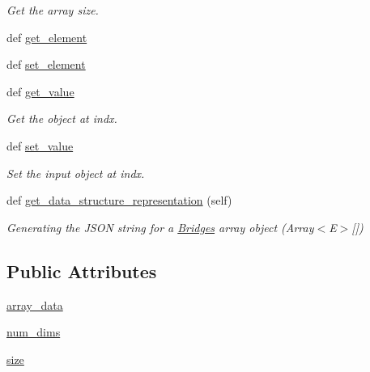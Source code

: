\begin{DoxyCompactItemize}
\begin{DoxyCompactList}\small\item\em Get the array size. \end{DoxyCompactList}\item 
def \hyperlink{class_array_1_1_array_af6c128376f7da8e5c9d5cff376e91d27}{get\+\_\+element}
\item 
def \hyperlink{class_array_1_1_array_ae0ef8d2502f319fe5dd57b965b36bfe9}{set\+\_\+element}
\item 
def \hyperlink{class_array_1_1_array_a5185dc5446c5a4462ebb50ce92ffb755}{get\+\_\+value}
\begin{DoxyCompactList}\small\item\em Get the object at \textquotesingle{}indx\textquotesingle{}. \end{DoxyCompactList}\item 
def \hyperlink{class_array_1_1_array_a682f36ee39851758da013ae3d2e6708a}{set\+\_\+value}
\begin{DoxyCompactList}\small\item\em Set the input object at \textquotesingle{}indx\textquotesingle{}. \end{DoxyCompactList}\item 
def \hyperlink{class_array_1_1_array_aaceb6a3c839b2345d966f3815a3bd1cb}{get\+\_\+data\+\_\+structure\+\_\+representation} (self)
\begin{DoxyCompactList}\small\item\em Generating the J\+S\+O\+N string for a \hyperlink{namespace_bridges}{Bridges} array object (Array$<$\+E$>$\mbox{[}\mbox{]}) \end{DoxyCompactList}\end{DoxyCompactItemize}
\subsection*{Public Attributes}
\begin{DoxyCompactItemize}
\item 
\hyperlink{class_array_1_1_array_a75d2d3965f5232a430b069c8cce78d80}{array\+\_\+data}
\item 
\hyperlink{class_array_1_1_array_ad20e83f196d6ccc482e3d49adaeaaf71}{num\+\_\+dims}
\item 
\hyperlink{class_array_1_1_array_a421362e43ac706de326ea5442db7116b}{size}
\end{DoxyCompactItemize}
